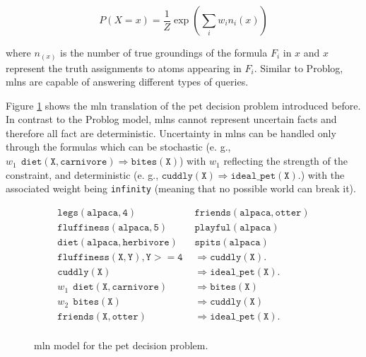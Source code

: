 $$ P(X=x) = \frac{1}{Z} \exp \left(  \sum_{i}w_in_i(x) \right) $$

where $n_(x)$ is the number of true groundings of the formula $F_i$ in $x$ and $x$ represent the truth assignments to atoms appearing in $F_i$.
Similar to Problog, \gls{mln}s are capable of answering different types of queries.


Figure \ref{fig:mln} shows the \gls{mln} translation of the pet decision problem introduced before.
In contrast to the Problog model, \gls{mln}s cannot represent uncertain facts and therefore all fact are deterministic.
Uncertainty in \gls{mln}s can be handled only through the formulas which can be stochastic (e. g., $w_1 ~~ {\mathtt {diet(X,carnivore)}} \Rightarrow {\mathtt {bites(X)}} $) with $w_1$ reflecting the strength of the constraint, and deterministic (e. g., ${\mathtt {cuddly(X)}} \Rightarrow \mathtt {ideal\_pet(X)}.$) with the associated weight being \texttt{infinity} (meaning that no possible world can break it).






\begin{figure}
	$$\begin{aligned}
		{\mathtt {legs(alpaca,4)}} ~~~~&{\mathtt {friends(alpaca,otter)}} \nonumber \\
		{\mathtt {fluffiness(alpaca,5)}} ~~~~&{\mathtt {playful(alpaca)}} \nonumber \\
		{\mathtt {diet(alpaca,herbivore)}} ~~~~&{\mathtt {spits(alpaca)}} \nonumber \\
		{\mathtt {fluffiness(X,Y),Y >= 4}} &\Rightarrow  \mathtt {cuddly(X)}. \nonumber \\
		{\mathtt {cuddly(X)}} &\Rightarrow \mathtt {ideal\_pet(X)}. \nonumber \\
		w_1 ~~ {\mathtt {diet(X,carnivore)}} &\Rightarrow {\mathtt {bites(X)}} \nonumber \\
		w_2 ~~ {\mathtt {bites(X)}} &\Rightarrow {\mathtt {cuddly(X)}}  \nonumber \\
		{\mathtt {friends(X,otter)}} &\Rightarrow {\mathtt {ideal\_pet(X)}}. \nonumber \\
	\end{aligned}$$
	\caption[The \gls{mln} translation of the Problog program in Figure~\ref{fig:problog}]{\gls{mln} model for the pet decision problem. \label{fig:mln}}
\end{figure}










\cleardoublepage

